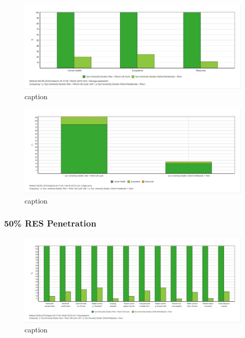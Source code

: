 \begin{figure}[H]
    \centering
    \includegraphics[width=\textwidth]{images/RES_0/Damage_Assessment_RES_0.JPG}
    \caption{caption}\label{fig:damage_assessment_RES_0}
\end{figure}

\begin{figure}[H]
    \centering
    \includegraphics[width=\textwidth]{images/RES_0/Single_Score_RES_0.JPG}
    \caption{caption}\label{fig:single_score_RES0}
\end{figure}

\subsubsection{50\% RES Penetration}

\begin{figure}[H]
    \centering
    \includegraphics[width=\textwidth]{images/RES_50/Characterization_RES_50.JPG}
    \caption{caption}\label{fig:characterization_RES_50}
\end{figure}

